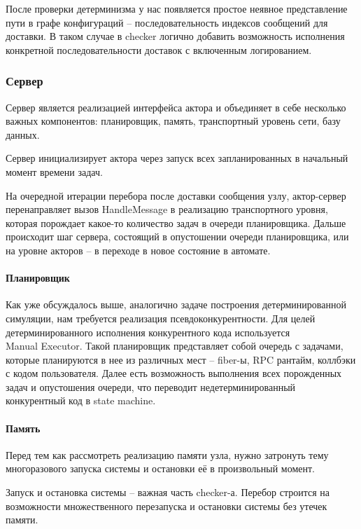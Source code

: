 После проверки детерминизма у нас появляется простое неявное представление пути в графе конфигураций – последовательность индексов сообщений для доставки. В таком случае в checker логично добавить возможность исполнения конкретной последовательности доставок с включенным логированием.

\subsubsection{Сервер}

Сервер является реализацией интерфейса актора и объединяет в себе несколько важных компонентов: планировщик, память, транспортный уровень сети, базу данных.

Сервер инициализирует актора через запуск всех запланированных в начальный момент времени задач.

На очередной итерации перебора после доставки сообщения узлу, актор-сервер перенаправляет вызов HandleMessage в реализацию транспортного уровня, которая порождает какое-то количество задач в очереди планировщика. Дальше происходит шаг сервера, состоящий в опустошении очереди планировщика, или на уровне акторов – в переходе в новое состояние в автомате.

\paragraph{Планировщик}\mbox{}

Как уже обсуждалось выше, аналогично задаче построения детерминированной симуляции, нам требуется реализация псевдоконкурентности. Для целей детерминированного исполнения конкурентного кода используется\\ Manual Executor. Такой планировщик представляет собой очередь с задачами, которые планируются в нее из различных мест – fiber-ы, RPC рантайм, коллбэки с кодом пользователя. Далее есть возможность выполнения всех порожденных задач и опустошения очереди, что переводит недетерминированный конкурентный код в state machine.

\paragraph{Память}\mbox{}

Перед тем как рассмотреть реализацию памяти узла, нужно затронуть тему многоразового запуска системы и остановки её в произвольный момент.

Запуск и остановка системы – важная часть checker-а. Перебор строится на возможности множественного перезапуска и остановки системы без утечек памяти.

